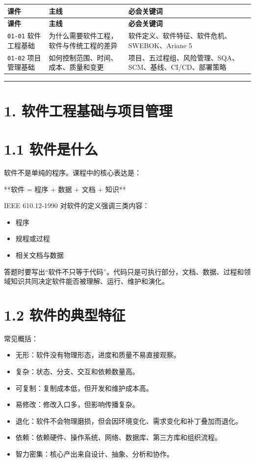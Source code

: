 \documentclass[UTF8,zihao=-4]{ctexart}
\begin{document}
{
\footnotesize
\begin{longtable}{|>{\raggedright\arraybackslash}p{}|>{\raggedright\arraybackslash}p{}|>{\raggedright\arraybackslash}p{}|}
\hline
\textbf{课件} & \textbf{主线} & \textbf{必会关键词} \\
\hline
\endfirsthead
\hline
\textbf{课件} & \textbf{主线} & \textbf{必会关键词} \\
\hline
\endhead
\texttt{01-01} 软件工程基础 & 为什么需要软件工程，软件与传统工程的差异 & 软件定义、软件特征、软件危机、SWEBOK、Ariane 5 \\
\hline
\texttt{01-02} 项目管理基础 & 如何控制范围、时间、成本、质量和变更 & 项目、五过程组、风险管理、SQA、SCM、基线、CI/CD、部署策略 \\
\hline
\end{longtable}
}


\bigskip\hrule\bigskip

\section{1. 软件工程基础与项目管理}

\section{1.1 软件是什么}

软件不是单纯的程序。课程中的核心表达是：

**软件 = 程序 + 数据 + 文档 + 知识**

IEEE 610.12-1990 对软件的定义强调三类内容：

\begin{itemize}
\item 程序
\item 规程或过程
\item 相关文档与数据
\end{itemize}

答题时要写出“软件不只等于代码”。代码只是可执行部分，文档、数据、过程和领域知识共同决定软件能否被理解、运行、维护和演化。

\section{1.2 软件的典型特征}

常见概括：

\begin{itemize}
\item 无形：软件没有物理形态，进度和质量不易直接观察。
\item 复杂：状态、分支、交互和依赖数量高。
\item 可复制：复制成本低，但开发和维护成本高。
\item 易修改：修改入口多，但影响传播复杂。
\item 退化：软件不会物理磨损，但会因环境变化、需求变化和补丁叠加而退化。
\item 依赖：依赖硬件、操作系统、网络、数据库、第三方库和组织流程。
\item 智力密集：核心产出来自设计、抽象、分析和协作。
\end{itemize}
\end{document}
